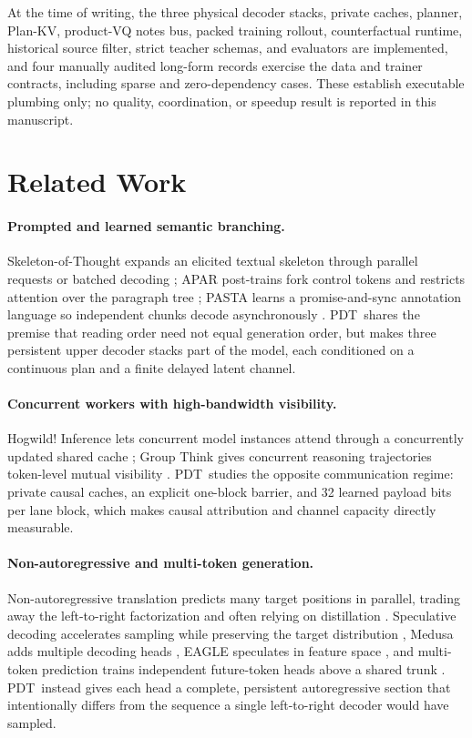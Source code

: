 \documentclass[10pt]{article}
\newcommand{\pdt}{\textsc{PDT}}
\begin{document}
At the time of writing, the three physical decoder stacks, private caches,
planner, Plan-KV, product-VQ notes bus, packed training rollout,
counterfactual runtime, historical source filter, strict teacher schemas, and
evaluators are implemented, and four manually audited long-form records
exercise the data and trainer contracts, including sparse and
zero-dependency cases. These establish executable plumbing only; no quality,
coordination, or speedup result is reported in this manuscript.

\section{Related Work}
\label{sec:related}

\paragraph{Prompted and learned semantic branching.}
Skeleton-of-Thought expands an elicited textual skeleton through parallel
requests or batched decoding \citep{ning2024sot}; APAR post-trains fork
control tokens and restricts attention over the paragraph tree
\citep{liu2024apar}; PASTA learns a promise-and-sync annotation language so
independent chunks decode asynchronously \citep{jin2025promise}. \pdt\ shares
the premise that reading order need not equal generation order, but makes
three persistent upper decoder stacks part of the model, each conditioned on
a continuous plan and a finite delayed latent channel.

\paragraph{Concurrent workers with high-bandwidth visibility.}
Hogwild! Inference lets concurrent model instances attend through a
concurrently updated shared cache \citep{rodionov2025hogwild}; Group Think
gives concurrent reasoning trajectories token-level mutual visibility
\citep{hsu2025groupthink}. \pdt\ studies the opposite communication regime:
private causal caches, an explicit one-block barrier, and 32 learned payload
bits per lane block, which makes causal attribution and channel capacity
directly measurable.

\paragraph{Non-autoregressive and multi-token generation.}
Non-autoregressive translation predicts many target positions in parallel,
trading away the left-to-right factorization and often relying on
distillation \citep{gu2018nat,kim2016seqkd}. Speculative decoding accelerates
sampling while preserving the target distribution \citep{leviathan2023spec},
Medusa adds multiple decoding heads \citep{cai2024medusa}, EAGLE speculates
in feature space \citep{li2024eagle}, and multi-token prediction trains
independent future-token heads above a shared trunk
\citep{gloeckle2024multitoken}. \pdt\ instead gives each head a complete,
persistent autoregressive section that intentionally differs from the
sequence a single left-to-right decoder would have sampled.
\end{document}
